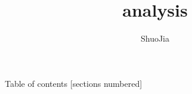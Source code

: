 \documentclass[10pt]{beamer}
\title{analysis}
\date{}
\author{ShuoJia}
\institute{Temple University}
\begin{document}
\maketitle

\begin{frame}{Table of contents}
  [sections numbered]
  \tableofcontents[hideallsubsections]
\end{frame}

\end{document}

